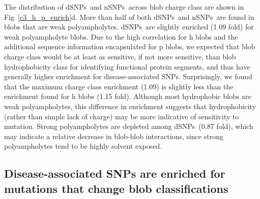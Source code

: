 \documentclass[10pt,letterpaper]{article}
\newcommand{\dSNPs}{dSNPs~}
\newcommand{\nSNPs}{nSNPs~}
\newcommand{\hydrochar}{hydrophobicity class}
\newcommand{\chargechar}{charge class}
\newcommand{\ruchi}[1]{\textcolor{blue}{#1}}
\begin{document}
The distribution of \dSNPs and \nSNPs across blob \chargechar{} are shown in Fig~\ref{c3_h_p_enrich}d. More than half of both \dSNPs and \nSNPs are found in blobs that are weak polyampholytes. \dSNPs are slightly enriched (1.09 fold) for weak polyampholyte blobs.  Due to the high correlation for h blobs and the additional sequence information encapsulated for p blobs, we expected that blob \chargechar{} would be at least as sensitive, if not more sensitive, than blob \hydrochar{} for identifying functional protein segments, and thus have generally higher enrichment for disease-associated SNPs. Surprisingly, we found that the maximum \chargechar{} enrichment (1.09) is slightly less than the enrichment found for h blobs (1.15 fold). Although most hydrophobic blobs are weak polyampholytes, this difference in enrichment suggests that hydrophobicity (rather than simple lack of charge) may be more indicative of sensitivity to mutation.  Strong polyampholytes are depleted among \dSNPs (0.87 fold), which may indicate a relative decrease in blob-blob interactions, since strong polyampholytes tend to be highly solvent exposed. 




\subsection*{Disease-associated SNPs are enriched for mutations that change blob classifications}
\end{document}
